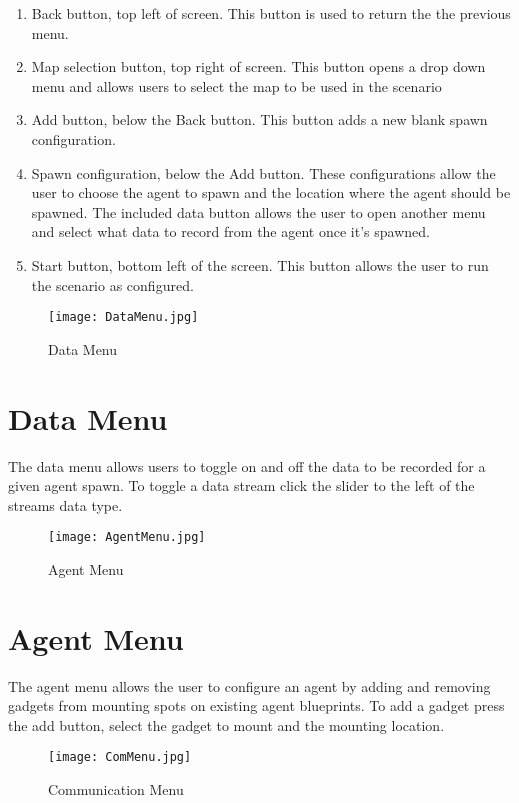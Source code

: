 \documentclass[../main.tex]{subfiles}
\begin{document}
\begin{enumerate}
\item Back button, top left of screen. This button is used to return the the previous menu.
\item Map selection button, top right of screen. This button opens a drop down menu and allows users to select the map to be used in the scenario
\item Add button, below the Back button. This button adds a new blank spawn configuration.
\item Spawn configuration, below the Add button. These configurations allow the user to choose the agent to spawn and the location where the agent should be spawned. The included data button allows the user to open another menu and select what data to record from the agent once it's spawned.
\item Start button, bottom left of the screen. This button allows the user to run the scenario as configured.
\end{enumerate}

\begin{figure}[H]
\texttt{[image: DataMenu.jpg]}
\caption{Data Menu}
\end{figure}

\section{Data Menu}
The data menu allows users to toggle on and off the data to be recorded for a given agent spawn. To toggle a data stream click the slider to the left of the streams data type.

\begin{figure}[H]
\texttt{[image: AgentMenu.jpg]}
\caption{Agent Menu}
\end{figure}

\section{Agent Menu}
The agent menu allows the user to configure an agent by adding and removing gadgets from mounting spots on existing agent blueprints. To add a gadget press the add button, select the gadget to mount and the mounting location.

\begin{figure}[H]
\texttt{[image: ComMenu.jpg]}
\caption{Communication Menu}
\end{figure}
\end{document}
